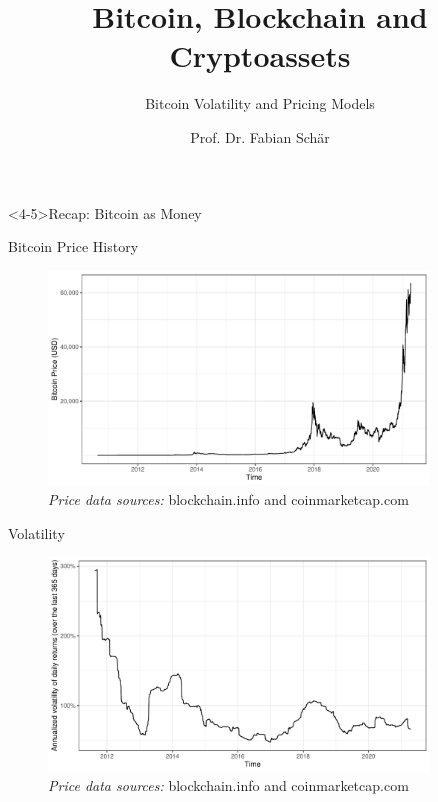 \documentclass[]{beamer}
\title{Bitcoin, Blockchain and Cryptoassets}
\subtitle{Bitcoin Volatility and Pricing Models}
\author{Prof. Dr. Fabian Schär}
\institute{University of Basel}
\begin{document}
\thispagestyle{empty}
\begin{frame}[noframenumbering]
	\titlepage
\end{frame}

\begin{frame}<4-5>{Recap: Bitcoin as Money}
	\begin{figure}
		
	\end{figure}
\end{frame}

\begin{frame}{Bitcoin Price History}
	\begin{figure}
		\includegraphics[width = 0.9\textwidth]{../assets/figures/price_graph}	
		\caption*{\textit{Price data sources:} blockchain.info and coinmarketcap.com}
	\end{figure}
\end{frame}

\begin{frame}{Volatility}
	\begin{figure}
		\includegraphics[width = 0.9\textwidth]{../assets/figures/volatility.pdf}
		\caption*{\textit{Price data sources:} blockchain.info and coinmarketcap.com}
	\end{figure}
\end{frame}
\end{document}

